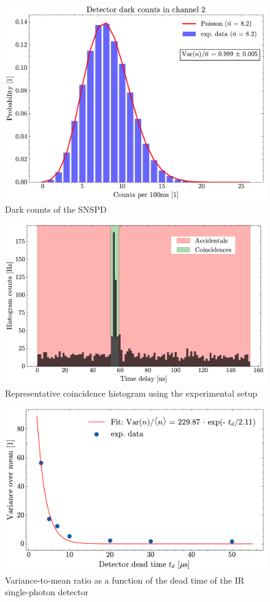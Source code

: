 \begin{figure}[h!]
\begin{minipage}{0.33\textwidth}
		\includegraphics[page=3,width=\linewidth]{Images/DC_chAll.pdf}
	\end{minipage}
	\caption{Dark counts of the SNSPD}
	\label{fig:DC}
\end{figure}

\begin{figure}[tb!]
	\centering
	\includegraphics[width=.7\textwidth]{Images/HistogramExample.pdf}
	\caption{Representative coincidence histogram using the experimental setup}
	\label{fig:HistExamAcc}
\end{figure}

\begin{figure}[tb!]
	\centering
	\includegraphics[width=.7\textwidth]{Images/VarMean_DeadTime_Afterpulsing.pdf}
	\caption{Variance-to-mean ratio as a function of the dead time of the IR single-photon detector}
	\label{fig:VoMDead}
\end{figure}